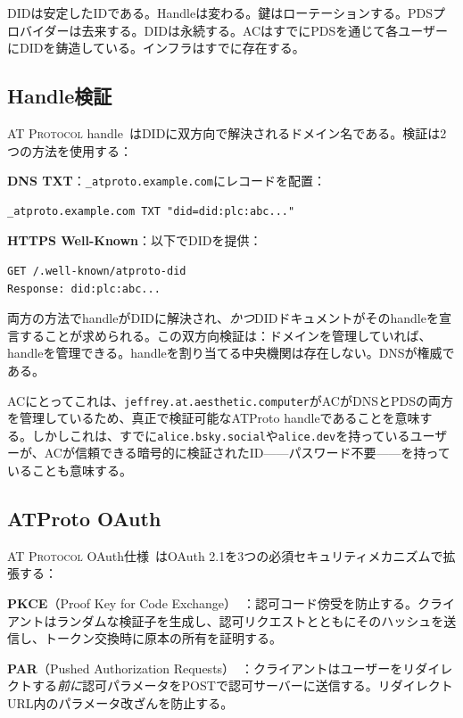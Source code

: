 \documentclass[10pt,letterpaper,twocolumn]{article}
\newcommand{\atproto}{\textsc{AT Protocol}}
\begin{document}
DIDは安定したIDである。Handleは変わる。鍵はローテーションする。PDSプロバイダーは去来する。DIDは永続する。ACはすでにPDSを通じて各ユーザーにDIDを鋳造している。インフラはすでに存在する。

\subsection{Handle検証}

\atproto{} handle~\citep{atproto2024handle}はDIDに双方向で解決されるドメイン名である。検証は2つの方法を使用する：

\textbf{DNS TXT}：\texttt{\_atproto.example.com}にレコードを配置：
\begin{lstlisting}
_atproto.example.com TXT "did=did:plc:abc..."
\end{lstlisting}

\textbf{HTTPS Well-Known}：以下でDIDを提供：
\begin{lstlisting}
GET /.well-known/atproto-did
Response: did:plc:abc...
\end{lstlisting}

両方の方法でhandleがDIDに解決され、\emph{かつ}DIDドキュメントがそのhandleを宣言することが求められる。この双方向検証は：ドメインを管理していれば、handleを管理できる。handleを割り当てる中央機関は存在しない。DNSが権威である。

ACにとってこれは、\texttt{jeffrey.at.aesthetic.computer}がACがDNSとPDSの両方を管理しているため、真正で検証可能なATProto handleであることを意味する。しかしこれは、すでに\texttt{alice.bsky.social}や\texttt{alice.dev}を持っているユーザーが、ACが信頼できる暗号的に検証されたID——パスワード不要——を持っていることも意味する。

\subsection{ATProto OAuth}

\atproto{} OAuth仕様~\citep{atproto2024oauth}はOAuth 2.1を3つの必須セキュリティメカニズムで拡張する：

\textbf{PKCE}（Proof Key for Code Exchange）~\citep{rfc7636pkce}：認可コード傍受を防止する。クライアントはランダムな検証子を生成し、認可リクエストとともにそのハッシュを送信し、トークン交換時に原本の所有を証明する。

\textbf{PAR}（Pushed Authorization Requests）~\citep{rfc9126par}：クライアントはユーザーをリダイレクトする\emph{前に}認可パラメータをPOSTで認可サーバーに送信する。リダイレクトURL内のパラメータ改ざんを防止する。
\end{document}
